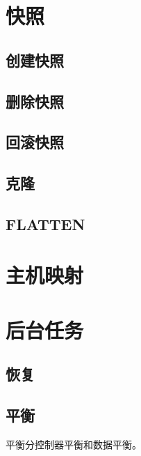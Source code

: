 \section{快照}

\subsection{创建快照}
\subsection{删除快照}
\subsection{回滚快照}
\subsection{克隆}
\subsection{FLATTEN}

\section{主机映射}

\section{后台任务}

\subsection{恢复}

\subsection{平衡}

平衡分控制器平衡和数据平衡。
